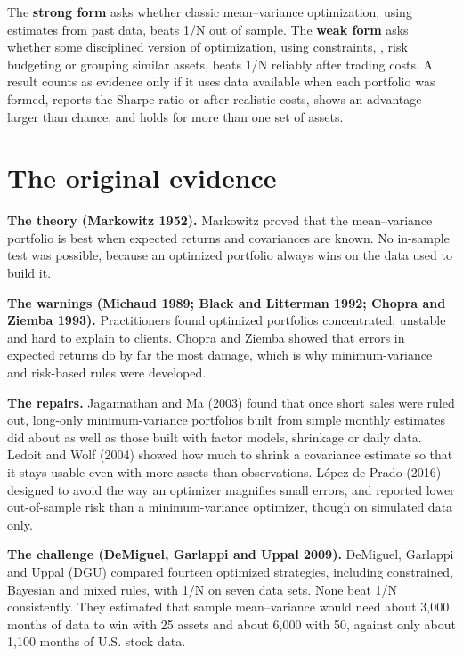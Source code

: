 The \textbf{strong form} asks whether classic mean--variance optimization, using estimates from past data, beats 1/N out of sample. The \textbf{weak form} asks whether some disciplined version of optimization, using constraints, , risk budgeting or grouping similar assets, beats 1/N reliably after trading costs. A result counts as evidence only if it uses data available when each portfolio was formed, reports the Sharpe ratio or  after realistic costs, shows an advantage larger than chance, and holds for more than one set of assets.

\section{The original evidence}
\label{sec:12-evidence}

\textbf{The theory (Markowitz 1952).} Markowitz proved that the mean--variance portfolio is best when expected returns and covariances are known. No in-sample test was possible, because an optimized portfolio always wins on the data used to build it.

\textbf{The warnings (Michaud 1989; Black and Litterman 1992; Chopra and Ziemba 1993).} Practitioners found optimized portfolios concentrated, unstable and hard to explain to clients. Chopra and Ziemba showed that errors in expected returns do by far the most damage, which is why minimum-variance and risk-based rules were developed.

\textbf{The repairs.} Jagannathan and Ma (2003) found that once short sales were ruled out, long-only minimum-variance portfolios built from simple monthly estimates did about as well as those built with factor models, shrinkage or daily data. Ledoit and Wolf (2004) showed how much to shrink a covariance estimate so that it stays usable even with more assets than observations. L\'opez de Prado (2016) designed  to avoid the way an optimizer magnifies small errors, and reported lower out-of-sample risk than a minimum-variance optimizer, though on simulated data only.

\textbf{The challenge (DeMiguel, Garlappi and Uppal 2009).} DeMiguel, Garlappi and Uppal (DGU) compared fourteen optimized strategies, including constrained, Bayesian and mixed rules, with 1/N on seven data sets. None beat 1/N consistently. They estimated that sample mean--variance would need about 3,000 months of data to win with 25 assets and about 6,000 with 50, against only about 1,100 months of U.S. stock data.

